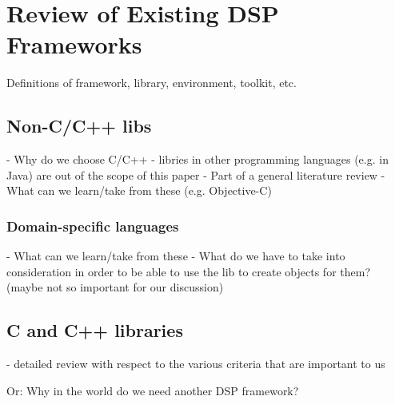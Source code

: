 \documentclass[twoside,10pt]{article}
\begin{document}






\section{Review of Existing DSP Frameworks} %



Definitions of framework, library, environment, toolkit, etc.

\subsection{Non-C/C++ libs}

- Why do we choose C/C++
- libries in other programming languages (e.g. in Java) are out of the scope of this paper
- Part of a general literature review
- What can we learn/take from these (e.g. Objective-C)

\subsubsection{Domain-specific languages}

- What can we learn/take from these
- What do we have to take into consideration in order to be able to use the lib to create objects for them? (maybe not so important for our discussion)


\subsection{C and C++ libraries}

- detailed review with respect to the various criteria that are important to us



Or: Why in the world do we need another DSP framework?

%
\end{document}
